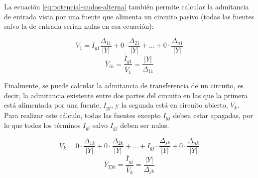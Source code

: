 La ecuación \ref{eq:potencial-nudos-alterna} también permite calcular
la admitancia de entrada vista por una fuente que alimenta un circuito
pasivo (todas las fuentes salvo la de entrada serían nulas en esa
ecuación):

\begin{equation}
  \overline{V}_1 = \overline{I}_{g1} \frac{\Delta_{11}}{|Y|} + 0 \cdot \frac{\Delta_{21}}{|Y|} + \dots + 0 \cdot \frac{\Delta_{n1}}{|Y|}
\end{equation}
\begin{equation}
  \overline{Y}_{in} = \frac{\overline{I}_{g1}}{\overline{V}_1}=  \frac{|Y|}{\Delta_{11}}
\end{equation}

Finalmente, se puede calcular la admitancia de transferencia de un
circuito, es decir, la admitancia existente entre dos partes del
circuito en las que la primera está alimentada por una fuente,
$I_{gj}$, y la segunda está en circuito abierto, $V_k$. Para realizar
este cálculo, todas las fuentes excepto $I_{gj}$ deben estar apagadas,
por lo que todos los términos $I_{gi}$ salvo $I_{gj}$ deben ser nulos.

\begin{equation}
  \overline{V}_k = 0 \cdot \frac{\Delta_{1k}}{|Y|} + 0 \cdot \frac{\Delta_{2k}}{|Y|} + \dots + I_{gj} \cdot \frac{\Delta_{jk}}{|Y|} + 0 \cdot \frac{\Delta_{nk}}{|Y|}
\end{equation}
\begin{equation}
  \label{eq:admitancia-transferencia}
  \overline{Y}_{Tjk} = \frac{\overline{I}_{gj}}{\overline{V}_k}=  \frac{|Y|}{\Delta_{jk}}
\end{equation}


	

